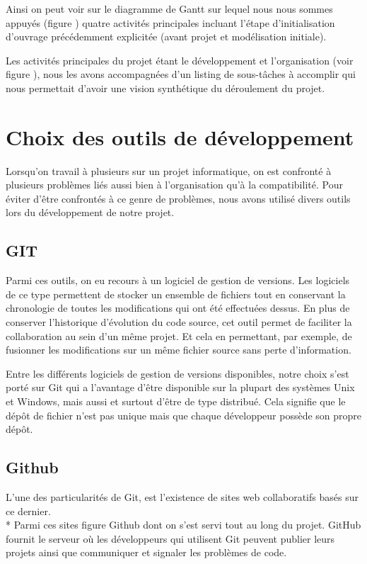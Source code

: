 \documentclass[12pt]{report}
\begin{document}
		Ainsi  on peut voir sur le diagramme de Gantt sur lequel nous nous sommes appuyés (figure ) quatre activités principales incluant l’étape d’initialisation d’ouvrage précédemment explicitée (avant projet et modélisation initiale).

		Les activités principales du projet étant le développement et l'organisation (voir figure  ), nous les avons accompagnées d’un listing de sous-tâches à accomplir qui nous permettait d’avoir une vision synthétique du déroulement du projet.
\newpage


\section{Choix des outils de développement}
	Lorsqu’on travail à plusieurs sur un projet informatique, on est confronté à plusieurs problèmes liés aussi bien  à l’organisation qu’à la compatibilité.
	Pour éviter d'être confrontés à ce genre de problèmes, nous avons  utilisé divers outils lors du développement de notre  projet.
	\subsection*{GIT}
	 Parmi ces outils, on eu recours à un logiciel de gestion de versions. Les logiciels de ce type  permettent  de stocker un ensemble de fichiers  tout en conservant la chronologie de toutes les modifications qui ont été effectuées dessus.
	 En plus de conserver l’historique d’évolution du code source, cet outil permet de faciliter la collaboration au sein d’un même projet. Et cela en permettant, par exemple, de fusionner les modifications sur un même fichier source sans perte d’information.

	 Entre les différents logiciels de gestion de versions disponibles, notre choix s’est porté sur Git qui a l’avantage d’être disponible sur la plupart des systèmes Unix et Windows, mais aussi et surtout d’être  de type distribué. Cela signifie que le dépôt de fichier n’est pas unique mais que chaque développeur possède son propre dépôt.


 \subsection*{Github}
   L’une des particularités de Git, est l’existence de sites web collaboratifs basés sur ce dernier.\\* Parmi ces sites figure Github  dont on s’est  servi tout  au long du projet.
   GitHub fournit le serveur où les développeurs qui utilisent Git peuvent publier leurs projets ainsi que communiquer et signaler les problèmes de code.
\end{document}
